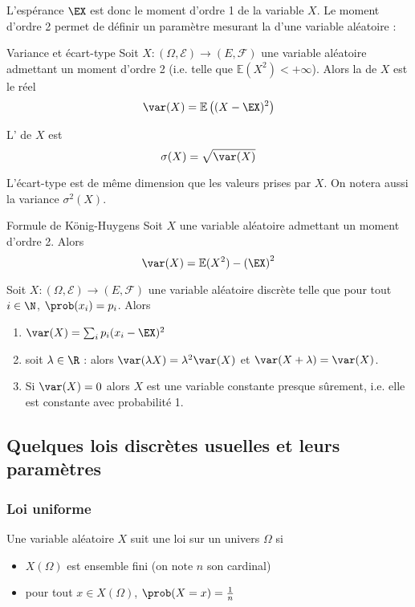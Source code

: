 L'espérance $\EX$ est donc le moment d'ordre 1 de la variable $X$. Le moment d'ordre 2 permet de définir un paramètre mesurant la  d'une variable aléatoire :

\begin{definition}{Variance et écart-type}{}
		Soit $X \colon (\Omega,\mathcal{E}) \to (E,\mathcal{F})$ une variable aléatoire admettant un moment d'ordre 2 (i.e. telle que $\mathbb{E}(X^2)<+\infty$). Alors la  de $X$ est le réel
		$$\var(X)=\mathbb{E}\left((X-\EX)^2\right)$$
		
		L' de $X$ est 
		$$\sigma(X)=\sqrt{\var(X)}$$
\end{definition}

L'écart-type est de même dimension que les valeurs prises par $X$. On notera aussi la variance $\sigma^2(X)$.

\begin{proposition}{Formule de König-Huygens}{}
	Soit $X$ une variable aléatoire admettant un moment d'ordre 2. Alors 
	$$\var(X)=\mathbb{E}(X^2)-\left(\EX\right)^2$$
\end{proposition}

\begin{proposition}{}{}
	Soit $X \colon (\Omega,\mathcal{E}) \to (E,\mathcal{F})$ une variable aléatoire discrète telle que pour tout $i \in \N $, $\prob(x_i)=p_i$. Alors
	\begin{enumerate}
		\item $\var(X)=\sum_i p_i (x_i-\EX)^2$
		\item soit $\lambda \in \R $ : alors $\var(\lambda X)= \lambda^2 \var(X)$ et $\var(X+\lambda)=\var(X)$.
		\item Si $\var(X)=0$ alors $X$ est une variable constante presque sûrement, i.e. elle est constante avec probabilité 1.
	\end{enumerate}
\end{proposition}

\subsection{Quelques lois discrètes usuelles et leurs paramètres}
\subsubsection{Loi uniforme}
\begin{definition}{}{}
	Une variable aléatoire $X$ suit une loi  sur un univers $\Omega$ si
	\begin{itemize}
		\item $X(\Omega)$ est ensemble fini (on note $n$ son cardinal)
		\item pour tout $x \in X(\Omega)$, $\prob(X=x)=\frac{1}{n}$
	\end{itemize}
\end{definition}


